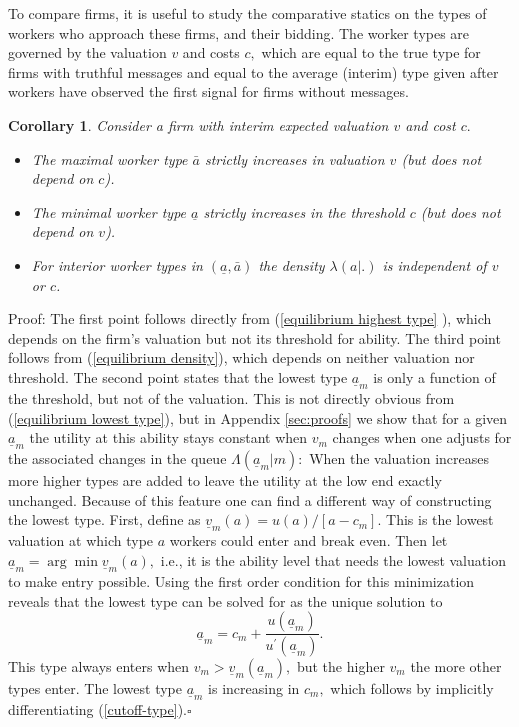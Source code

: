 \documentclass[12pt]{article}
\theoremstyle{plain}
\newtheorem{corollary}[theorem]{Corollary}
\begin{document}
To compare firms, it is useful to study the comparative statics on the types
of workers who approach these firms, and their bidding. The worker types are
governed by the valuation $v$ and costs $c,$ which are equal to the true
type for firms with truthful messages and equal to the average (interim)
type given after workers have observed the first signal for firms without
messages.

\begin{corollary}
\label{corollary}Consider a firm with interim expected valuation $v$ and cost 
$c.$

\begin{itemize}
\item The maximal worker type $\bar{a}$ strictly increases in valuation $v$
(but does not depend on $c$).

\item The minimal worker type $\underline{a}$ strictly increases in the
threshold $c$ (but does not depend on $v$).

\item For interior worker types in $(\underline{a}, \bar{a})$ the density $\lambda (a|.)$ is independent of $v$ or $c$.
\end{itemize}
\end{corollary}

Proof: The first point follows directly from (\ref{equilibrium highest type}%
), which depends on the firm's valuation but not its threshold for ability.
The third point follows from (\ref{equilibrium density}), which depends on
neither valuation nor threshold. The second point states that the lowest type $\underline{a}_{m}$ is only a
function of the threshold, but not of the valuation. This is not directly
obvious from (\ref{equilibrium lowest type}), but in Appendix \ref{sec:proofs} we show
that for a given $\underline{a}_{m}$ the utility at this ability stays
constant when $v_{m}$ changes when one adjusts for the associated changes in
the queue $\Lambda (\underline{a}_{m}|m):$ When the valuation increases more
higher types are added to leave the utility at the low end exactly
unchanged. Because of this feature one can find a different way of
constructing the lowest type. First, define as $\underline{v}%
_{m}(a)=u(a)/[a-c_{m}].$ This is the lowest valuation at which type $a$
workers could enter and break even. Then let $\underline{a}_{m}=\arg \min 
\underline{v}_{m}(a),$ i.e., it is the ability level that needs the lowest
valuation to make entry possible. Using the first order condition for this
minimization reveals that the lowest type can be solved for as the unique
solution to%
\begin{equation}\label{cutoff-type}
\underline{a}_{m}=c_{m}+\frac{u(\underline{a}_{m})}{u^{\prime }(\underline{a}%
_{m})}.
\end{equation}%
This type always enters when $v_{m}>\underline{v}_{m}(\underline{a}_{m}),$
but the higher $v_{m}$ the more other types enter. The lowest type $%
\underline{a}_{m}$ is increasing in $c_{m},$ which follows by implicitly
differentiating (\ref{cutoff-type}).$\square $
\end{document}
